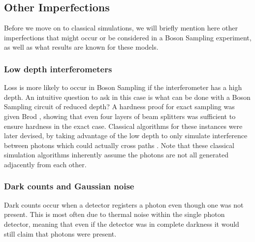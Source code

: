 \subsection{Other Imperfections}

Before we move on to classical simulations, we will briefly mention here other imperfections that might occur or be considered in a Boson Sampling experiment, as well as what results are known for these models.

\subsubsection{Low depth interferometers}

Loss is more likely to occur in Boson Sampling if the interferometer has a high depth. An intuitive question to ask in this case is what can be done with a Boson Sampling circuit of reduced depth? A hardness proof for exact sampling was given Brod \cite{brod2015}, showing that even four layers of beam splitters was sufficient to ensure hardness in the exact case. Classical algorithms for these instances were later devised, by taking advantage of the low depth to only simulate interference between photons which could actually cross paths \cite{deshpande2018, maskara2019}. Note that these classical simulation algorithms inherently assume the photons are not all generated adjacently from each other.

\subsubsection{Dark counts and Gaussian noise}

Dark counts occur when a detector registers a photon even though one was not present. This is most often due to thermal noise within the single photon detector, meaning that even if the detector was in complete darkness it would still claim that photons were present.

